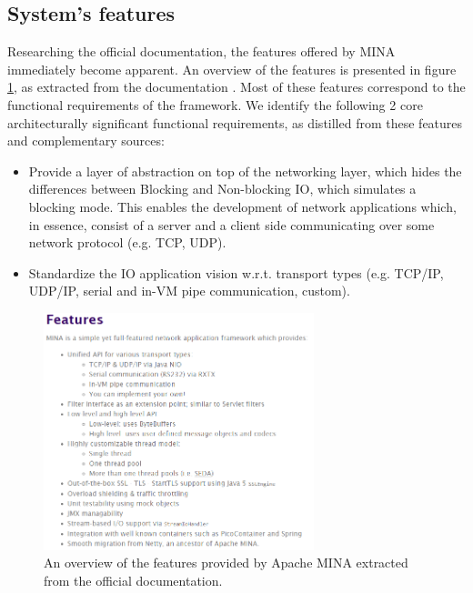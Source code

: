 \subsection{System's features}
\label{sec:features}
Researching the official documentation, the features offered by MINA immediately become apparent. An overview of the features is presented in figure \ref{fig:features}, as extracted from the documentation \cite{mina-docs}. Most of these features correspond to the functional requirements of the framework. We identify the following 2 core architecturally significant functional requirements, as distilled from these features and complementary sources:
\begin{itemize}
    \item Provide a layer of abstraction on top of the networking layer, which hides the differences between Blocking and Non-blocking IO, which simulates a blocking mode. This enables the development of network applications which, in essence, consist of a server and a client side communicating over some network protocol (e.g. TCP, UDP). 
    
    
    \item Standardize the IO application vision w.r.t. transport types (e.g. TCP/IP, UDP/IP, serial and in-VM pipe  communication, custom).
    
\end{itemize}

\begin{figure}
    \centering
    \includegraphics[width=0.7\textwidth]{images/features.png}
    \caption{An overview of the features provided by Apache MINA extracted from the official documentation.}
    \label{fig:features}
\end{figure}

